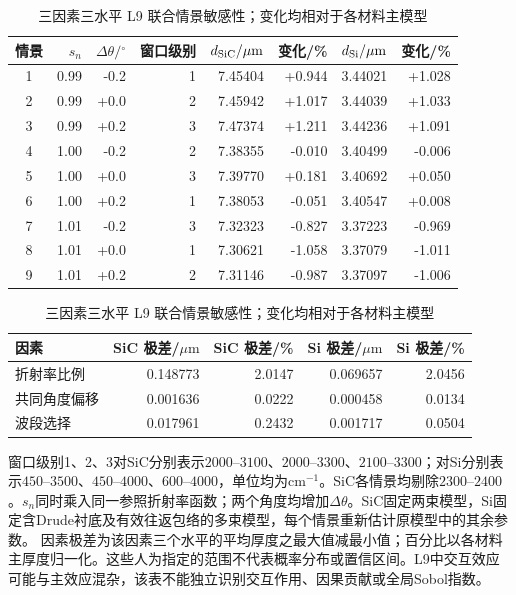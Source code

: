 \begin{table}[htbp]
\centering
\caption{三因素三水平 L9 联合情景敏感性；变化均相对于各材料主模型}
\label{tab:joint-sensitivity}
\small
\setlength{\tabcolsep}{4pt}
\begin{tabular}{crrrrrrr}
\toprule
情景 & $s_n$ & $\Delta\theta/{}^\circ$ & 窗口级别 & $d_{\rm SiC}/\mu\mathrm m$ & 变化/\% & $d_{\rm Si}/\mu\mathrm m$ & 变化/\%\\
\midrule
1 & 0.99 & -0.2 & 1 & 7.45404 & +0.944 & 3.44021 & +1.028 \\
2 & 0.99 & +0.0 & 2 & 7.45942 & +1.017 & 3.44039 & +1.033 \\
3 & 0.99 & +0.2 & 3 & 7.47374 & +1.211 & 3.44236 & +1.091 \\
4 & 1.00 & -0.2 & 2 & 7.38355 & -0.010 & 3.40499 & -0.006 \\
5 & 1.00 & +0.0 & 3 & 7.39770 & +0.181 & 3.40692 & +0.050 \\
6 & 1.00 & +0.2 & 1 & 7.38053 & -0.051 & 3.40547 & +0.008 \\
7 & 1.01 & -0.2 & 3 & 7.32323 & -0.827 & 3.37223 & -0.969 \\
8 & 1.01 & +0.0 & 1 & 7.30621 & -1.058 & 3.37079 & -1.011 \\
9 & 1.01 & +0.2 & 2 & 7.31146 & -0.987 & 3.37097 & -1.006 \\
\bottomrule
\end{tabular}
\par\smallskip
\begin{tabular}{lrrrr}
\toprule
因素 & SiC 极差/$\mu\mathrm m$ & SiC 极差/\% & Si 极差/$\mu\mathrm m$ & Si 极差/\%\\
\midrule
折射率比例 & 0.148773 & 2.0147 & 0.069657 & 2.0456 \\
共同角度偏移 & 0.001636 & 0.0222 & 0.000458 & 0.0134 \\
波段选择 & 0.017961 & 0.2432 & 0.001717 & 0.0504 \\
\bottomrule
\end{tabular}
\par\smallskip
\begin{minipage}{0.98\textwidth}\footnotesize
窗口级别1、2、3对SiC分别表示$2000$--$3100$、$2000$--$3300$、$2100$--$3300$；对Si分别表示$450$--$3500$、$450$--$4000$、$600$--$4000$，单位均为$\mathrm{cm}^{-1}$。SiC各情景均剔除$2300$--$2400$。$s_n$同时乘入同一参照折射率函数；两个角度均增加$\Delta\theta$。SiC固定两束模型，Si固定含Drude衬底及有效往返包络的多束模型，每个情景重新估计原模型中的其余参数。
因素极差为该因素三个水平的平均厚度之最大值减最小值；百分比以各材料主厚度归一化。这些人为指定的范围不代表概率分布或置信区间。L9中交互效应可能与主效应混杂，该表不能独立识别交互作用、因果贡献或全局Sobol指数。
\end{minipage}
\end{table}
